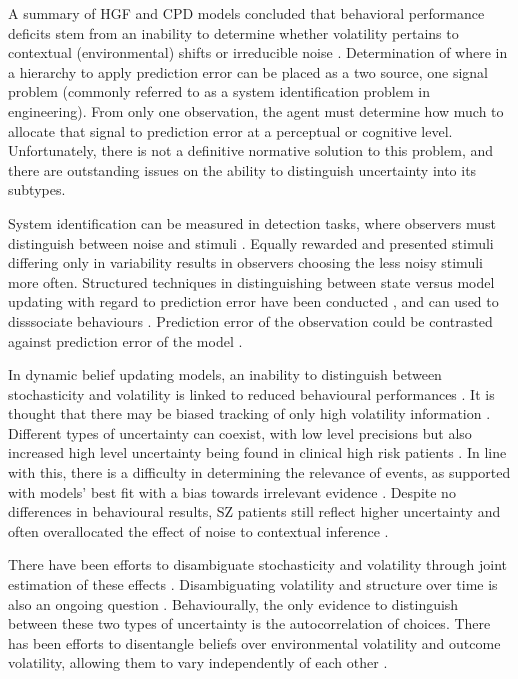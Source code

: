 \documentclass{article}
\begin{document}
A summary of HGF and CPD models concluded that behavioral performance deficits stem from an inability to determine whether volatility pertains to contextual (environmental) shifts or irreducible noise \citep{katthagen2022models}. Determination of where in a hierarchy to apply prediction error can be placed as a two source, one signal problem (commonly referred to as a system identification problem in engineering). From only one observation, the agent must determine how much to allocate that signal to prediction error at a perceptual or cognitive level. Unfortunately, there is not a definitive normative solution to this problem, and there are outstanding issues on the ability to distinguish uncertainty into its subtypes.

System identification can be measured in detection tasks, where observers must distinguish between noise and stimuli \citep{rahnev2018suboptimality}. Equally rewarded and presented stimuli differing only in variability results in observers choosing the less noisy stimuli more often. Structured techniques in distinguishing between state versus model updating with regard to prediction error have been conducted \citep{rutar2023differentiating}, and can used to disssociate behaviours \citep{oreilly2013dissociable}. Prediction error of the observation could be contrasted against prediction error of the model \citep{rutar2023differentiating}.

In dynamic belief updating models, an inability to distinguish between stochasticity and volatility is linked to reduced behavioural performances \citep{katthagen2022models}. It is thought that there may be biased tracking of only high volatility information \citep{katthagen2022models}. Different types of uncertainty can coexist, with low level precisions but also increased high level uncertainty being found in clinical high risk patients \citep{cole2020atypical}. In line with this, there is a difficulty in determining the relevance of events, as supported with models’ best fit with a bias towards irrelevant evidence \citep{kesby2023neural}. Despite no differences in behavioural results, SZ patients still reflect higher uncertainty \citep{kreis2022spared} and often overallocated the effect of noise to contextual inference \citep{kaplan2016estimating}.

There have been efforts to disambiguate stochasticity and volatility through joint estimation of these effects \citep{piray2021model}. Disambiguating volatility and structure over time is also an ongoing question \citep{yu2021adaptive}. Behaviourally, the only evidence to distinguish between these two types of uncertainty is the autocorrelation of choices. There has been efforts to disentangle beliefs over environmental volatility and outcome volatility, allowing them to vary independently of each other \citep{mikus2023computational}.
\end{document}
